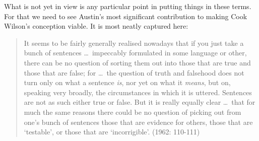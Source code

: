 What is not yet in view is any particular point in putting things in these terms. For that we need to see Austin's most significant contribution to making Cook Wilson's conception viable. It is most neatly captured here:
\begin{quote}
	It seems to be fairly generally realised nowadays that if you just take a bunch of sentences \ldots\ impeccably formulated in some language or other, there can be no question of sorting them out into those that are true and those that are false; for \ldots\ the question of truth and falsehood does not turn only on what a sentence \emph{is}, nor yet on what it \emph{means}, but on, speaking very broadly, the circumstances in which it is uttered. Sentences are not as such either true or false. But it is really equally clear \ldots\ that for much the same reasons there could be no question of picking out from one’s bunch of sentences those that are evidence for others, those that are `testable', or those that are `incorrigible'. (1962: 110-111)
\end{quote}
